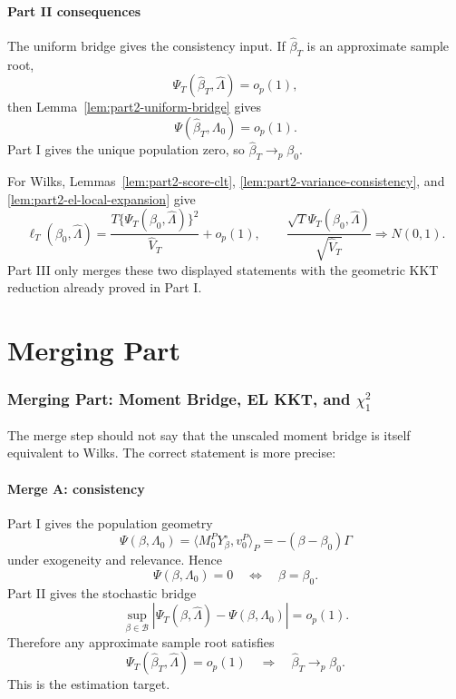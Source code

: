 \documentclass[12pt]{article}
\numberwithin{equation}{section}
\theoremstyle{definition}
\newcommand{\op}{o_p}
\newcommand{\innerP}[2]{\langle #1,#2\rangle_P}
\begin{document}
\subsection{Part II consequences}

The uniform bridge gives the consistency input. If \(\widehat\beta_T\) is an
approximate sample root,
\[
    \Psi_T(\widehat\beta_T,\widehat\Lambda)=\op(1),
\]
then Lemma~\ref{lem:part2-uniform-bridge} gives
\[
    \Psi(\widehat\beta_T,\Lambda_0)=\op(1).
\]
Part I gives the unique population zero, so \(\widehat\beta_T\to_p\beta_0\).

For Wilks, Lemmas~\ref{lem:part2-score-clt},
\ref{lem:part2-variance-consistency}, and \ref{lem:part2-el-local-expansion}
give
\[
    \ell_T(\beta_0,\widehat\Lambda)
    =\frac{T\{\Psi_T(\beta_0,\widehat\Lambda)\}^2}{\widehat V_T}+\op(1),
    \qquad
    \frac{\sqrt T\Psi_T(\beta_0,\widehat\Lambda)}{\sqrt{\widehat V_T}}
    \Rightarrow N(0,1).
\]
Part III only merges these two displayed statements with the geometric KKT
reduction already proved in Part I.
\part{Merging Part}

\section{Merging Part: Moment Bridge, EL KKT, and \texorpdfstring{\(\chi_1^2\)}{chi-square}}

The merge step should not say that the unscaled moment bridge is itself
equivalent to Wilks. The correct statement is more precise:

\begin{center}
\end{center}

\subsection{Merge A: consistency}

Part I gives the population geometry
\[
    \Psi(\beta,\Lambda_0)
    =\innerP{M_0^PY_\beta^\circ}{v_0^P}
    =-(\beta-\beta_0)\Gamma
\]
under exogeneity and relevance. Hence
\[
    \Psi(\beta,\Lambda_0)=0
    \quad\Longleftrightarrow\quad
    \beta=\beta_0.
\]
Part II gives the stochastic bridge
\[
    \sup_{\beta\in\mathcal B}
    |\Psi_T(\beta,\widehat\Lambda)-\Psi(\beta,\Lambda_0)|=\op(1).
\]
Therefore any approximate sample root satisfies
\[
    \Psi_T(\widehat\beta_T,\widehat\Lambda)=\op(1)
    \quad\Longrightarrow\quad
    \widehat\beta_T\to_p\beta_0.
\]
This is the estimation target.
\end{document}
